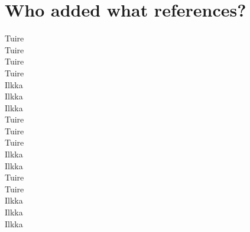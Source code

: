 \documentclass{sigchi}
\begin{document}
\section{Who added what references?}
\cite{rich99} Tuire \\
\cite{fischer01} Tuire \\
\cite{dillon96} Tuire \\
\cite{pu02} Tuire \\
\cite{pazzani97} Ilkka \\
\cite{bunt04} Ilkka \\
\cite{findlater04} Ilkka \\
\cite{hearst02} Tuire \\
\cite{kuhlt91} Tuire \\
\cite{march06} Tuire \\
\cite{white09} Ilkka \\
\cite{tvaro11} Ilkka \\
\cite{oconnor10} Tuire \\
\cite{sugi04} Tuire \\
\cite{white07} Ilkka \\
\cite{whitemm08} Ilkka \\
\cite{kules08} Ilkka \\




%
%
%
%
%
\balance



\end{document}
